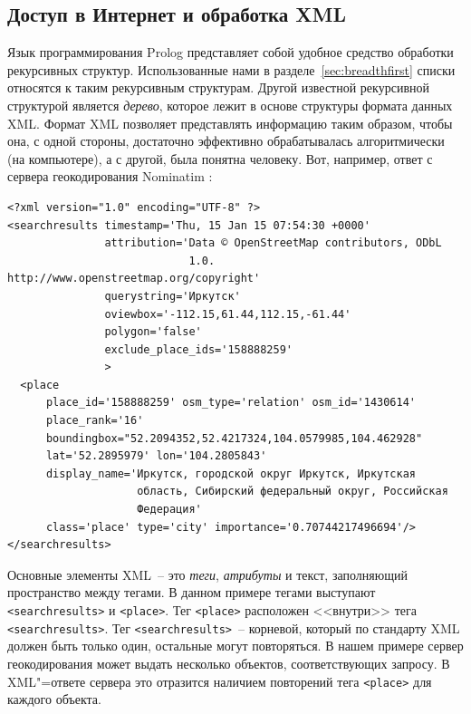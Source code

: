 \documentclass[a4paper,14pt, openany, twoside, final]{extbook} %
\begin{document}
\subsection{Доступ в Интернет и обработка XML}
\label{sec:inetxml}

Язык программирования Prolog представляет собой удобное средство обработки рекурсивных структур.  Использованные нами в разделе~\ref{sec:breadthfirst} списки относятся к таким рекурсивным структурам.  Другой известной рекурсивной структурой является \emph{дерево}, которое лежит в основе структуры формата данных XML.  Формат XML позволяет представлять информацию таким образом, чтобы она, с одной стороны, достаточно эффективно обрабатывалась алгоритмически (на компьютере), а с другой, была понятна человеку.  Вот, например, ответ с сервера геокодирования \foreignlanguage{latin}{Nominatim} \cite{nominatim}:\enlargethispage{-2em}

\begin{verbatim}
<?xml version="1.0" encoding="UTF-8" ?>
<searchresults timestamp='Thu, 15 Jan 15 07:54:30 +0000'
               attribution='Data © OpenStreetMap contributors, ODbL
                            1.0. http://www.openstreetmap.org/copyright'
               querystring='Иркутск'
               oviewbox='-112.15,61.44,112.15,-61.44'
               polygon='false'
               exclude_place_ids='158888259'
               >
  <place
      place_id='158888259' osm_type='relation' osm_id='1430614'
      place_rank='16'
      boundingbox="52.2094352,52.4217324,104.0579985,104.462928"
      lat='52.2895979' lon='104.2805843'
      display_name='Иркутск, городской округ Иркутск, Иркутская
                    область, Сибирский федеральный округ, Российская
                    Федерация'
      class='place' type='city' importance='0.70744217496694'/>
</searchresults>
\end{verbatim}


Основные элементы XML~-- это \emph{теги}, \emph{атрибуты} и текст, заполняющий пространство между тегами.  В данном примере тегами выступают \texttt{<searchresults>} и \texttt{<place>}.  Тег \texttt{<place>} расположен <<внутри>> тега \texttt{<searchresults>}.  Тег \texttt{<searchresults>}~-- корневой, который по стандарту XML должен быть только один, остальные могут повторяться.  В нашем примере сервер геокодирования может выдать несколько объектов, соответствующих запросу.  В XML"=ответе сервера это отразится наличием повторений тега \texttt{<place>} для каждого объекта.
\end{document}
